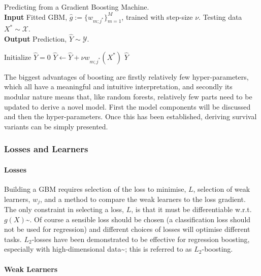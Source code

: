 \documentclass[
  letterpaper,
]{scrbook}
\let\oldparagraph\paragraph
\renewcommand{\paragraph}[1]{\oldparagraph{#1}\mbox{}}
\theoremstyle{plain}
\theoremstyle{definition}
\theoremstyle{remark}
\begin{document}
\begin{algorithm}[H]
\caption{Predicting from a Gradient Boosting Machine. \\
\textbf{Input} Fitted GBM, $\hat{g}:= \{w_{m;j^*}\}^M_{m=1}$, trained with step-size $\nu$. Testing data $X^* \sim \mathcal{X}$. \\
\textbf{Output} Prediction, $\hat{Y}\sim \mathcal{Y}$.}\label{alg:surv_gbm_pred}
\begin{algorithmic}[1]
\State Initialize $\hat{Y}= 0$
\State $\hat{Y}\gets \hat{Y}+ \nu w_{m;j^*}(X^*)$
\EndFor
\State\Return$\hat{Y}$
\end{algorithmic}
\end{algorithm}

The biggest advantages of boosting are firstly relatively few
hyper-parameters, which all have a meaningful and intuitive
interpretation, and secondly its modular nature means that, like random
forests, relatively few parts need to be updated to derive a novel
model. First the model components will be discussed and then the
hyper-parameters. Once this has been established, deriving survival
variants can be simply presented.

\subsubsection{Losses and Learners}

\paragraph{Losses}

Building a GBM requires selection of the loss to minimise, \(L\),
selection of weak learners, \(w_j\), and a method to compare the weak
learners to the loss gradient. The only constraint in selecting a loss,
\(L\), is that it must be differentiable w.r.t.
\(g(X)\)\textasciitilde{}\cite{Hastie2001}. Of course a sensible loss
should be chosen (a classification loss should not be used for
regression) and different choices of losses will optimise different
tasks. \(L_2\)-losses have been demonstrated to be effective for
regression boosting, especially with high-dimensional
data\textasciitilde{}\cite{Buhlmann2003}; this is referred to as
\(L_2\)-boosting.

\paragraph{Weak Learners}
\end{document}
